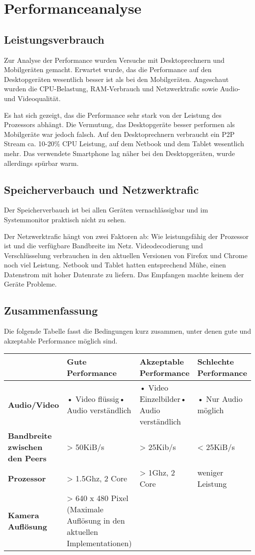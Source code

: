 \chapter{Performanceanalyse}
	\section{Leistungsverbrauch}
		Zur Analyse der Performance wurden Versuche mit Desktoprechnern und Mobilgeräten gemacht. Erwartet wurde, das die Performance auf den Desktopgeräten wesentlich besser ist als bei den Mobilgeräten.
		Angeschaut wurden die CPU-Belastung, RAM-Verbrauch und Netzwerktrafic sowie Audio- und Videoqualität.
		
		Es hat sich gezeigt, das die Performance sehr stark von der Leistung des Prozessors abhängt. Die Vermutung, das Desktopgeräte besser performen als Mobilgeräte war jedoch falsch. 
		Auf den Desktoprechnern verbraucht ein P2P Stream ca. 10-20\% CPU Leistung, auf dem Netbook und dem Tablet wesentlich mehr. Das verwendete Smartphone lag näher bei den Desktopgeräten, wurde allerdings spürbar warm.	
		
	\section{Speicherverbauch und Netzwerktrafic}
		Der Speicherverbauch ist bei allen Geräten vernachlässigbar und im Systemmonitor praktisch nicht zu sehen.
		
		Der Netzwerktrafic hängt von zwei Faktoren ab: Wie leistungsfähig der Prozessor ist und die verfügbare Bandbreite im Netz. 	
		Videodecodierung und Verschlüsselung verbrauchen in den aktuellen Versionen von Firefox und Chrome noch viel Leistung. Netbook und Tablet hatten entsprechend Mühe, einen Datenstrom mit hoher Datenrate zu liefern. Das Empfangen machte keinem der Geräte Probleme.
	
	\section{Zusammenfassung}
		Die folgende Tabelle fasst die Bedingungen kurz zusammen, unter denen gute und akzeptable Performance möglich sind.
		
		\noindent
		\begin{tabularx}{\linewidth}{|X|X|X|X|}
			\hline
			& \textbf{Gute Performance} & \textbf{Akzeptable Performance} & \textbf{Schlechte Performance} \\
			\hline
			\textbf{Audio/Video} & • Video flüssig\newline• Audio verständlich & • Video Einzelbilder\newline• Audio verständlich & • Nur Audio möglich\\
			\hline
			\textbf{Bandbreite zwischen den Peers} &> 50KiB/s &> 25Kib/s &< 25KiB/s \\
			\hline
			\textbf{Prozessor} &> 1.5Ghz, 2 Core &> 1Ghz, 2 Core &weniger Leistung \\
			\hline
			\textbf{Kamera Auflösung} &> 640 x 480 Pixel (Maximale Auflösung in den aktuellen Implementationen) & & \\
			\hline
		\end{tabularx}
		
